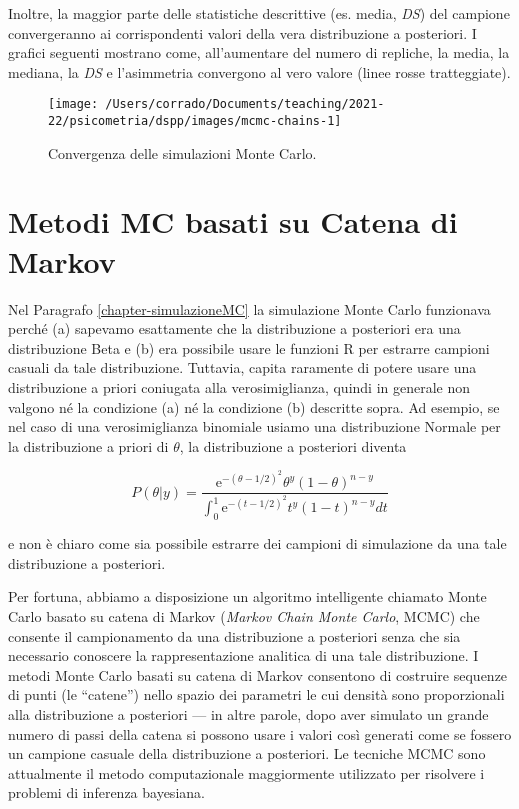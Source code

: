 \documentclass[
]{memoir}
\begin{document}
Inoltre, la maggior parte delle statistiche descrittive (es. media, \emph{DS}) del campione convergeranno ai corrispondenti valori della vera distribuzione a posteriori. I grafici seguenti mostrano come, all'aumentare del numero di repliche, la media, la mediana, la \emph{DS} e l'asimmetria convergono al vero valore (linee rosse tratteggiate).

\begin{figure}

{\centering \texttt{[image: /Users/corrado/Documents/teaching/2021-22/psicometria/dspp/images/mcmc-chains-1]} 

}

\caption{Convergenza delle simulazioni Monte Carlo.}\label{fig:mcmc-chains-1}
\end{figure}

\hypertarget{metodi-mc-basati-su-catena-di-markov}{%
\section{Metodi MC basati su Catena di Markov}\label{metodi-mc-basati-su-catena-di-markov}}

Nel Paragrafo \ref{chapter-simulazioneMC} la simulazione Monte Carlo funzionava perché (a) sapevamo esattamente che la distribuzione a posteriori era una distribuzione Beta e (b) era possibile usare le funzioni R per estrarre campioni casuali da tale distribuzione. Tuttavia, capita raramente di potere usare una distribuzione a priori coniugata alla verosimiglianza, quindi in generale non valgono né la condizione (a) né la condizione (b) descritte sopra. Ad esempio, se nel caso di una verosimiglianza binomiale usiamo una distribuzione Normale per la distribuzione a priori di \(\theta\), la distribuzione a posteriori diventa

\[
P(\theta | y) = \frac{\mathrm{e}^{-(\theta - 1 / 2)^2} \theta^y (1 - \theta)^{n - y}} {\int_0^1 \mathrm{e}^{-(t - 1 / 2)^2} t^y (1 - t)^{n - y} dt}
\]

e non è chiaro come sia possibile estrarre dei campioni di simulazione da una tale distribuzione a posteriori.

Per fortuna, abbiamo a disposizione un algoritmo intelligente chiamato Monte Carlo basato su catena di Markov (\emph{Markov Chain Monte Carlo}, MCMC) che consente il campionamento da una distribuzione a posteriori senza che sia necessario conoscere la rappresentazione analitica di una tale distribuzione. I metodi Monte Carlo basati su catena di Markov consentono di costruire sequenze di punti (le ``catene'') nello spazio dei parametri le cui densità sono proporzionali alla distribuzione a posteriori --- in altre parole, dopo aver simulato un grande numero di passi della catena si possono usare i valori così generati come se fossero un campione casuale della distribuzione a posteriori. Le tecniche MCMC sono attualmente il metodo computazionale maggiormente utilizzato per risolvere i problemi di inferenza bayesiana.
\end{document}
